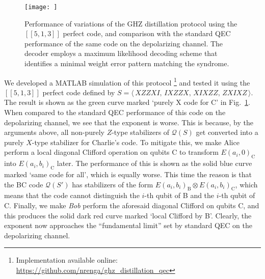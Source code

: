 \documentclass[journal,onecolumn]{IEEEtran}
\newcommand{\llbr}{[\![}
\newcommand{\rrbr}{]\!]}
\begin{document}
\begin{figure}


\begin{center}
    \texttt{[image: ]}
\end{center}

\caption{\label{fig:GHZ_5qubit_code}Performance of variations of the GHZ distillation protocol using the $\llbr 5,1,3 \rrbr$ perfect code, and comparison with the standard QEC performance of the same code on the depolarizing channel. The decoder employs a maximum likelihood decoding scheme that identifies a minimal weight error pattern matching the syndrome.}


\end{figure}



We developed a MATLAB simulation of this protocol%
\footnote{Implementation available online: \url{https://github.com/nrenga/ghz_distillation_qec}}
and tested it using the $\llbr 5,1,3 \rrbr$ perfect code defined by $S = \langle \, XZZXI,\, IXZZX,\, XIXZZ,\, ZXIXZ \, \rangle$.
The result is shown as the green curve marked `purely X code for C' in Fig.~\ref{fig:GHZ_5qubit_code}.
When compared to the standard QEC performance of this code on the depolarizing channel, we see that the exponent is worse.
This is because, by the arguments above, all non-purely $Z$-type stabilizers of $\mathcal{Q}(S)$ get converted into a purely $X$-type stabilizer for Charlie's code.
To mitigate this, we make Alice perform a local diagonal Clifford operation on qubits C to transform $E(a_i,0)_{\text{C}}$ into $E(a_i,b_i)_{\text{C}}$ later.
The performance of this is shown as the solid blue curve marked `same code for all', which is equally worse.
This time the reason is that the BC code $\mathcal{Q}(S')$ has stabilizers of the form $E(a_i,b_i)_{\text{B}} \otimes E(a_i,b_i)_{\text{C}}$, which means that the code cannot distinguish the $i$-th qubit of B and the $i$-th qubit of C.
Finally, we make \emph{Bob} perform the aforesaid diagonal Clifford on qubits C, and this produces the solid dark red curve marked `local Clifford by B'.
Clearly, the exponent now approaches the ``fundamental limit'' set by standard QEC on the depolarizing channel.
\end{document}
